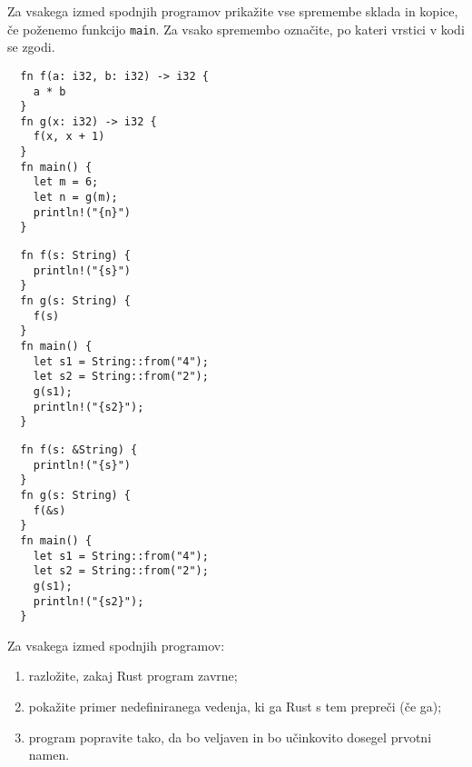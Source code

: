 \documentclass[arhiv]{../izpit}
\begin{document}


\naloga[\tocke{15}]

Za vsakega izmed spodnjih programov prikažite vse spremembe sklada in kopice, če poženemo funkcijo \texttt{main}. Za vsako spremembo označite, po kateri vrstici v kodi se zgodi.

\podnaloga
\begin{verbatim}
  fn f(a: i32, b: i32) -> i32 {
    a * b
  }
  fn g(x: i32) -> i32 {
    f(x, x + 1)
  }
  fn main() {
    let m = 6;
    let n = g(m);
    println!("{n}")
  }
\end{verbatim}

\podnaloga
\begin{verbatim}
  fn f(s: String) {
    println!("{s}")
  }
  fn g(s: String) {
    f(s)
  }
  fn main() {
    let s1 = String::from("4");
    let s2 = String::from("2");
    g(s1);
    println!("{s2}");
  }
\end{verbatim}

\podnaloga
\begin{verbatim}
  fn f(s: &String) {
    println!("{s}")
  }
  fn g(s: String) {
    f(&s)
  }
  fn main() {
    let s1 = String::from("4");
    let s2 = String::from("2");
    g(s1);
    println!("{s2}");
  }
\end{verbatim}



\naloga[\tocke{35}]

Za vsakega izmed spodnjih programov:
\begin{enumerate}
  \item razložite, zakaj Rust program zavrne;
  \item pokažite primer nedefiniranega vedenja, ki ga Rust s tem prepreči (če ga);
  \item program popravite tako, da bo veljaven in bo učinkovito dosegel prvotni namen.
\end{enumerate}

\podnaloga

\podnaloga

\podnaloga

\podnaloga

\podnaloga
\end{document}

